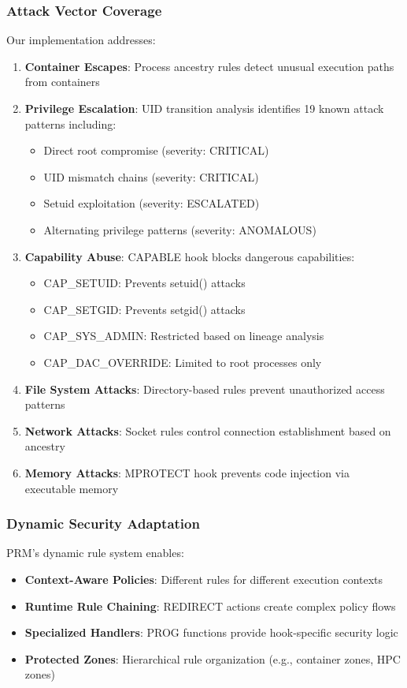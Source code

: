 \documentclass[conference]{IEEEtran}
\begin{document}
\subsubsection{Attack Vector Coverage}
Our implementation addresses:
\begin{enumerate}
\item \textbf{Container Escapes}: Process ancestry rules detect unusual execution paths from containers
\item \textbf{Privilege Escalation}: UID transition analysis identifies 19 known attack patterns including:
   \begin{itemize}
   \item Direct root compromise (severity: CRITICAL)
   \item UID mismatch chains (severity: CRITICAL)
   \item Setuid exploitation (severity: ESCALATED)
   \item Alternating privilege patterns (severity: ANOMALOUS)
   \end{itemize}
\item \textbf{Capability Abuse}: CAPABLE hook blocks dangerous capabilities:
   \begin{itemize}
   \item CAP\_SETUID: Prevents setuid() attacks
   \item CAP\_SETGID: Prevents setgid() attacks
   \item CAP\_SYS\_ADMIN: Restricted based on lineage analysis
   \item CAP\_DAC\_OVERRIDE: Limited to root processes only
   \end{itemize}
\item \textbf{File System Attacks}: Directory-based rules prevent unauthorized access patterns
\item \textbf{Network Attacks}: Socket rules control connection establishment based on ancestry
\item \textbf{Memory Attacks}: MPROTECT hook prevents code injection via executable memory
\end{enumerate}

\subsubsection{Dynamic Security Adaptation}
PRM's dynamic rule system enables:
\begin{itemize}
\item \textbf{Context-Aware Policies}: Different rules for different execution contexts
\item \textbf{Runtime Rule Chaining}: REDIRECT actions create complex policy flows
\item \textbf{Specialized Handlers}: PROG functions provide hook-specific security logic
\item \textbf{Protected Zones}: Hierarchical rule organization (e.g., container zones, HPC zones)
\end{itemize}
\end{document}
